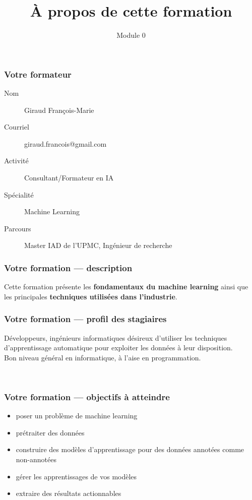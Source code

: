 \documentclass{formation}
\title{À propos de cette formation}
\subtitle{Module 0}
\begin{document}
\maketitle

\begin{frame}
  \frametitle{Votre formateur}
  \begin{description}
  \item[Nom] Giraud François-Marie
  \item[Courriel] giraud.francois@gmail.com
  \item[Activité] Consultant/Formateur en IA
  \item[Spécialité] Machine Learning
  \item[Parcours] Master IAD de l'UPMC, Ingénieur de recherche
  \end{description}
\end{frame}

\begin{frame}
  \frametitle{Votre formation — description}
  Cette formation présente les \textbf{fondamentaux du machine
    learning} ainsi que les principales \textbf{techniques utilisées
    dans l’industrie}.
\end{frame}

\begin{frame}
  \frametitle{Votre formation — profil des stagiaires}
  Développeurs, ingénieurs informatiques désireux d’utiliser les
  techniques d’apprentissage automatique pour exploiter les données à
  leur disposition. \\
  \newline
  Bon niveau général en informatique, à l’aise en programmation. \\
  \begin{center}
    \\
    $\;$\\
  \end{center}
\end{frame}

\begin{frame}
  \frametitle{Votre formation — objectifs à atteindre}

  \begin{itemize}
  \item poser un problème de machine learning
  \item prétraiter des données
  \item construire des modèles d'apprentissage pour des données
    annotées comme non-annotées
  \item gérer les apprentissages de vos modèles
  \item extraire des résultats actionnables
  \end{itemize}
\end{frame}
\end{document}
